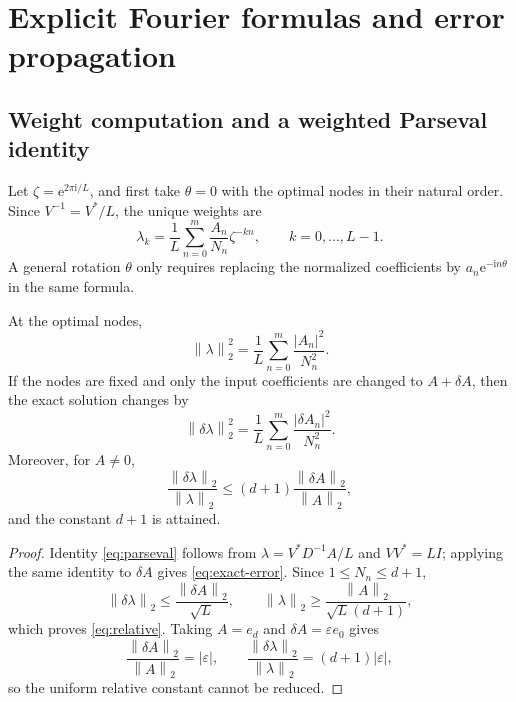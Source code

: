 \documentclass[10pt,twoside,final]{siamart1116}
\numberwithin{equation}{section}
\numberwithin{theorem}{section}
\newcommand{\norm}[1]{\left\lVert#1\right\rVert_2}
\newcommand{\e}{\mathrm e}
\newcommand{\ii}{\mathrm i}
\begin{document}
\section{Explicit Fourier formulas and error propagation}\label{sec:fourier}

\subsection{Weight computation and a weighted Parseval identity}

Let $\zeta=\e^{2\pi\ii/L}$, and first take $\theta=0$ with the optimal nodes in their
natural order. Since $V^{-1}=V^*/L$, the unique weights are
\begin{equation}\label{eq:FFT}
\lambda_k=\frac1L\sum_{n=0}^{m}\frac{A_n}{N_n}\zeta^{-kn},
\qquad k=0,\ldots,L-1.
\end{equation}
A general rotation $\theta$ only requires replacing the normalized coefficients by
$a_n\e^{-\ii n\theta}$ in the same formula.

\begin{proposition}\label{prop:perturb}
At the optimal nodes,
\begin{equation}\label{eq:parseval}
\norm{\lambda}^2=\frac1L\sum_{n=0}^{m}\frac{|A_n|^2}{N_n^2}.
\end{equation}
If the nodes are fixed and only the input coefficients are changed to $A+\delta A$,
then the exact solution changes by
\begin{equation}\label{eq:exact-error}
\norm{\delta\lambda}^2=\frac1L\sum_{n=0}^{m}\frac{|\delta A_n|^2}{N_n^2}.
\end{equation}
Moreover, for $A\ne0$,
\begin{equation}\label{eq:relative}
\frac{\norm{\delta\lambda}}{\norm{\lambda}}
\le(d+1)\frac{\norm{\delta A}}{\norm{A}},
\end{equation}
and the constant $d+1$ is attained.
\end{proposition}
\begin{proof}
Identity \eqref{eq:parseval} follows from $\lambda=V^*D^{-1}A/L$ and $VV^*=LI$; applying
the same identity to $\delta A$ gives \eqref{eq:exact-error}. Since
$1\le N_n\le d+1$,
\[
\norm{\delta\lambda}\le\frac{\norm{\delta A}}{\sqrt L},
\qquad \norm{\lambda}\ge\frac{\norm A}{\sqrt L(d+1)},
\]
which proves \eqref{eq:relative}. Taking $A=e_d$ and $\delta A=\varepsilon e_0$ gives
\[
\frac{\norm{\delta A}}{\norm A}=|\varepsilon|,
\qquad
\frac{\norm{\delta\lambda}}{\norm\lambda}=(d+1)|\varepsilon|,
\]
so the uniform relative constant cannot be reduced.
\end{proof}
\end{document}
